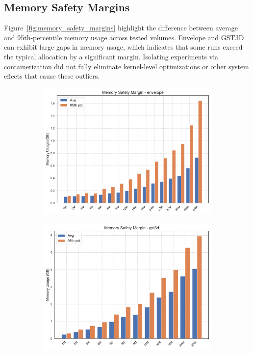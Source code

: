\subsection{Memory Safety Margins}
\label{subsec:memory-safety-margins}

Figure~\ref{fig:memory_safety_margins} highlight the difference between average and 95th-percentile memory usage across tested volumes.
Envelope and \ac{GST3D} can exhibit large gaps in memory usage, which indicates that some runs exceed the typical allocation by a significant margin.
Isolating experiments via containerization did not fully eliminate kernel-level optimizations or other system effects that cause these outliers.

\begin{figure}[htbp]
    \centering
    \begin{subfigure}[t]{0.49\textwidth}
        \centering
        \includegraphics[width=\textwidth]{assets/images/05/memory_safety_margin_envelope}
    \end{subfigure}
    \hfill
    \begin{subfigure}[t]{0.49\textwidth}
        \centering
        \includegraphics[width=\textwidth]{assets/images/05/memory_safety_margin_gst3d}

\end{subfigure}
\end{figure}

